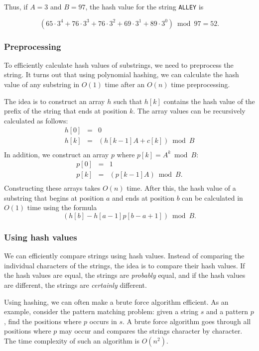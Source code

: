 Thus, if $A=3$ and $B=97$, the hash value
for the string \texttt{ALLEY} is

\[(65 \cdot 3^4 + 76 \cdot 3^3 + 76 \cdot 3^2 + 69 \cdot 3^1 + 89 \cdot 3^0) \bmod 97 = 52.\]

\subsubsection*{Preprocessing}

To efficiently calculate hash values of substrings,
we need to preprocess the string.
It turns out that using polynomial hashing,
we can calculate the hash value of any substring
in $O(1)$ time after an $O(n)$ time preprocessing.

The idea is to construct an array $h$ such that
$h[k]$ contains the hash value of the prefix
of the string that ends at position $k$.
The array values can be recursively calculated as follows:
\[
\begin{array}{lcl}
h[0] & = & 0 \\
h[k] & = & (h[k-1] A + c[k]) \bmod B \\
\end{array}
\]
In addition, we construct an array $p$
where $p[k]=A^k \bmod B$:
\[
\begin{array}{lcl}
p[0] & = & 1 \\
p[k] & = & (p[k-1] A) \bmod B. \\
\end{array}
\]
Constructing these arrays takes $O(n)$ time.
After this, the hash value of a substring
that begins at position $a$ and ends at position $b$
can be calculated in $O(1)$ time using the formula
\[(h[b]-h[a-1] p[b-a+1]) \bmod B.\]

\subsubsection*{Using hash values}

We can efficiently compare strings using hash values.
Instead of comparing the individual characters of the strings,
the idea is to compare their hash values.
If the hash values are equal,
the strings are \emph{probably} equal,
and if the hash values are different,
the strings are \emph{certainly} different.

Using hashing, we can often make a brute force
algorithm efficient.
As an example, consider the pattern matching problem:
given a string $s$ and a pattern $p$,
find the positions where $p$ occurs in $s$.
A brute force algorithm goes through all positions
where $p$ may occur and compares the strings
character by character.
The time complexity of such an algorithm is $O(n^2)$.

